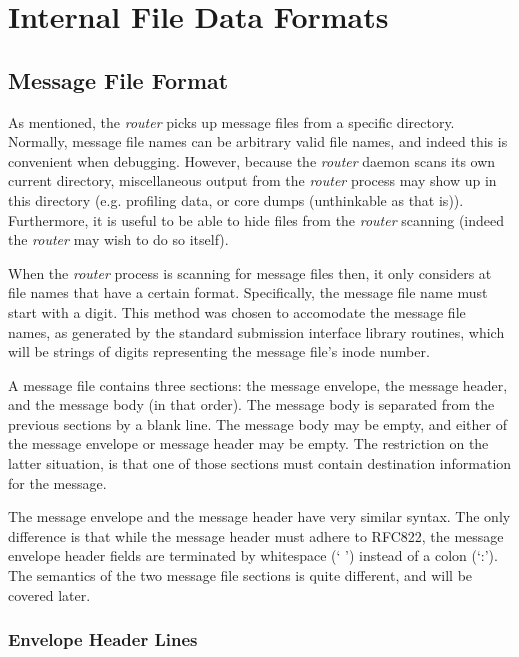 \section{Internal File Data Formats}

\subsection{Message File Format}

As mentioned, the {\em router\/} picks up message files from a specific directory.
Normally, message file names can be arbitrary valid file names, and indeed
this is convenient when debugging.  However, because the {\em router\/} daemon
scans its own current directory, miscellaneous output from the {\em router\/}
process may show up in this directory (e.g. profiling data, or core dumps
(unthinkable as that is)).  Furthermore, it is useful to be able to hide
files from the {\em router\/} scanning (indeed the {\em router\/} may wish to do so
itself).

When the {\em router\/} process is scanning for message files then, it only
considers at file names that have a certain format.  Specifically, the
message file name must start with a digit.  This method was chosen to
accomodate the message file names, as generated by the standard submission
interface library routines, which will be strings of digits representing
the message file's inode number.

A message file contains three sections: the message envelope, the message
header, and the message body (in that order).  The message body is
separated from the previous sections by a blank line.  The message body may
be empty, and either of the message envelope or message header may be
empty.  The restriction on the latter situation, is that one of those
sections must contain destination information for the message.

The message envelope and the message header have very similar syntax.  The
only difference is that while the message header must adhere to RFC822, the
message envelope header fields are terminated by whitespace (` ') instead
of a colon (`:').  The semantics of the two message file sections is quite
different, and will be covered later.




\subsubsection{Envelope Header Lines}



